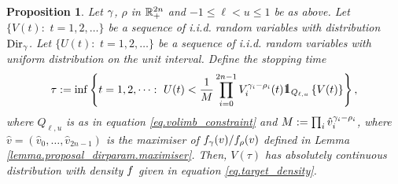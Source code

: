 \documentclass[10pt, article,table]{article}
\newtheorem{prop}[thm]{Proposition}
\begin{document}
\begin{prop}\label{prop.rejection_sampling}
 Let $\dirparam$, $\rho$ in $\R_{+}^{2n}$ and $-1\leq \ell < u \leq 1$ be as above. 
 Let $\lbrace V(t): \, \, t=1,2,\dots \rbrace$ be a sequence of i.i.d. random variables with distribution $\text{Dir}_{\dirparam}$. Let $\lbrace U(t): \, \, t=1,2,\dots \rbrace$ be a sequence of i.i.d. random variables with uniform distribution on the unit interval. Define the stopping time 
 \begin{equation*}
  \tau := \inf \left\lbrace 
  t=1,2,\dots : \, \, 
  U(t)<\frac{1}{M} \prod_{i=0}^{2n-1} V_{i}^{\dirparam_i - \rho_i}(t)
  \one_{Q_{\ell,u}}\left\lbrace V(t)\right\rbrace
  \right\rbrace,
 \end{equation*}
where $Q_{\ell,u}$ is as in equation \eqref{eq.volimb_constraint} and $M:= \prod_i \hat{v}_{i}^{\dirparam_i - \rho_i}$, where $\hat{v} = (\hat{v}_0,\dots,\hat{v}_{2n-1})$ is the maximiser of $\dirichletDensity[\dirparam](v)/\dirichletDensity[\rho](v)$ defined in Lemma \ref{lemma.proposal_dirparam.maximiser}. Then, $V(\tau)$ has absolutely continuous distribution with density $\targetDensity$ given in equation \eqref{eq.target_density}.
\end{prop}
\end{document}
